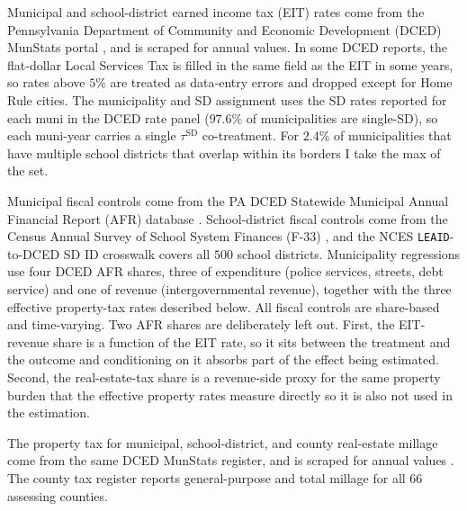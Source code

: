 \documentclass[12pt]{article}
\begin{document}
Municipal and school-district earned income tax (EIT) rates come from the Pennsylvania
Department of Community and Economic Development (DCED) MunStats
portal \citep{padcedMunStats}, and is scraped for annual values. In some DCED reports, the flat-dollar Local Services Tax is filled in the same field
as the EIT in some years, so rates above $5\%$ are treated as
data-entry errors and dropped except for Home Rule cities. The municipality and SD assignment uses the SD rates reported for each muni in
the DCED rate panel ($97.6\%$ of municipalities are single-SD), so
each muni-year carries a single $\tau^{\text{SD}}$ co-treatment. For $2.4\%$ of municipalities that have multiple school districts that overlap within its borders I take the max of the set.

Municipal fiscal controls come from the PA DCED Statewide Municipal
Annual Financial Report (AFR) database \citep{padcedAFR}. School-district
fiscal controls come from the Census Annual Survey of School System
Finances (F-33) \citep{censusF33}, and the NCES \texttt{LEAID}-to-DCED
SD ID crosswalk covers all $500$ school districts. Municipality regressions use
four DCED AFR shares, three of expenditure (police services, streets,
debt service) and one of revenue (intergovernmental revenue), together
with the three effective property-tax rates described below. All fiscal
controls are share-based and time-varying. Two AFR shares are deliberately left out. First, the EIT-revenue share is a function of
the EIT rate, so it sits between the treatment and the outcome and
conditioning on it absorbs part of the effect being estimated. Second, the
real-estate-tax share is a revenue-side proxy for the same property burden
that the effective property rates measure directly so it is also not used in the estimation. 


The property tax for municipal, school-district, and county real-estate
millage come from the same DCED MunStats register, and is scraped for annual values
\citep{padcedMunStats}. The county tax register reports general-purpose
and total millage for all $66$ assessing counties.
\end{document}
